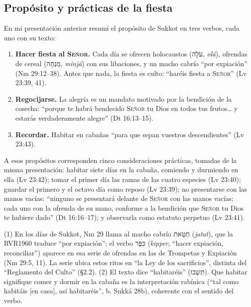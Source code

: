 \documentclass[11pt,letterpaper]{article}
\newcommand{\heb}[1]{\mbox{\foreignlanguage{hebrew}{#1}}}
\newcommand{\SENOR}{\textsc{Señor}}
\begin{document}
\subsection{Propósito y prácticas de la fiesta}
En mi presentación anterior resumí el propósito de Sukkot en tres verbos, cada uno con su texto:

\begin{enumerate}
\item \textbf{Hacer fiesta al \SENOR.} Cada día se ofrecen holocaustos (\heb{עֹלָה}, \emph{olá}), ofrendas de cereal (\heb{מִנְחָה}, \emph{minjá}) con sus libaciones, y un macho cabrío ``por expiación'' (Nm 29:12--38). Antes que nada, la fiesta es culto: ``haréis fiesta a \SENOR'' (Lv 23:39, 41).
\item \textbf{Regocijarse.} La alegría es un mandato motivado por la bendición de la cosecha: ``porque te habrá bendecido \SENOR{} tu Dios en todos tus frutos\ldots{} y estarás verdaderamente alegre'' (Dt 16:13--15).
\item \textbf{Recordar.} Habitar en cabañas ``para que sepan vuestros descendientes'' (Lv 23:43).
\end{enumerate}

A esos propósitos corresponden cinco consideraciones prácticas, tomadas de la misma presentación: habitar siete días en la cabaña, comiendo y durmiendo en ella (Lv 23:42); tomar el primer día las ramas de las cuatro especies (Lv 23:40); guardar el primero y el octavo día como reposo (Lv 23:39); no presentarse con las manos vacías: ``ninguno se presentará delante de \SENOR{} con las manos vacías; cada uno con la ofrenda de su mano, conforme a la bendición que \SENOR{} tu Dios te hubiere dado'' (Dt 16:16--17); y observarla como estatuto perpetuo (Lv 23:41).

\begin{nota}[Precisión]
(1) En los días de Sukkot, Nm 29 llama al macho cabrío \heb{חַטָּאת} (\emph{jatat}), que la RVR1960 traduce ``por expiación''; el verbo \heb{כִּפֶּר} (\emph{kipper}, ``hacer expiación, reconciliar'') aparece en esa serie de ofrendas en las de Trompetas y Expiación (Nm 29:5, 11). La serie ubica estos ritos en ``la Ley de los sacrificios'', distinta del ``Reglamento del Culto'' (§2.2). (2) El texto dice ``habitaréis'' (\heb{תֵּשְׁבוּ}). Que habitar signifique comer y dormir en la cabaña es la interpretación rabínica (``tal como habitáis [en casa], así habitaréis'', b. Sukká 28b), coherente con el sentido del verbo.
\end{nota}
\end{document}
